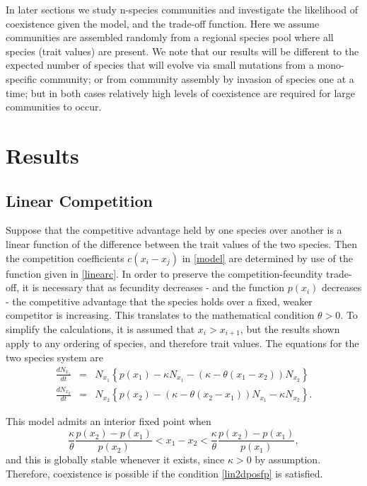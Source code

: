 In later sections we study n-species communities and investigate the likelihood of coexistence given the model, and the trade-off function. Here we assume communities are assembled randomly from a regional species pool where all species (trait values) are present. We note that our results will be different to the expected number of species that will evolve via small mutations from a mono-specific community; or from community assembly by invasion of species one at a time; but in both cases relatively high levels of coexistence are required for large communities to occur.

\section{Results}

\subsection{Linear Competition}
Suppose that the competitive advantage held by one species over another is a linear function of the difference between the trait values of the two species. Then the competition coefficients $c(x_i -x_j)$ in \eqref{model} are determined by use of the function given in \eqref{linearc}. In order to preserve the competition-fecundity trade-off, it is necessary that as fecundity decreases - and the function $p(x_i)$  decreases - the competitive advantage that the species holds over a fixed, weaker competitor is increasing. This translates to the mathematical condition $\theta>0$. To simplify the calculations, it is assumed that $x_i>x_{i+1}$, but the results shown apply to any ordering of species, and therefore trait values. 
The equations for the two species system are
\begin{eqnarray*}
\frac{dN_{x_1}}{dt} & = & N_{x_1} \left\{ p(x_1) - \kappa N_{x_1} - (\kappa-\theta(x_1-x_2))N_{x_2} \right\}\\
\frac{dN_{x_2}}{dt} & = & N_{x_2} \left\{ p(x_2) - (\kappa-\theta(x_2-x_1))N_{x_1}-\kappa N_{x_2}\right\}.
\end{eqnarray*}

This model admits an interior fixed point when
\begin{equation}
\label{lin2dposfp}
 \frac{\kappa}{\theta}\frac{p(x_2)-p(x_1)}{p(x_2)}<x_1-x_2< \frac{\kappa}{\theta}\frac{p(x_2)-p(x_1)}{p(x_1)},
 \end{equation}
and this is globally stable  whenever it exists, since $\kappa>0$ by assumption. Therefore, coexistence is possible if the condition \eqref{lin2dposfp} is satisfied.

